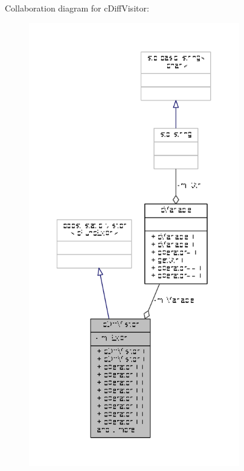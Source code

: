 Collaboration diagram for c\-Diff\-Visitor\-:
\nopagebreak
\begin{figure}[H]
\begin{center}
\leavevmode
\includegraphics[height=550pt]{classcDiffVisitor__coll__graph}
\end{center}
\end{figure}
